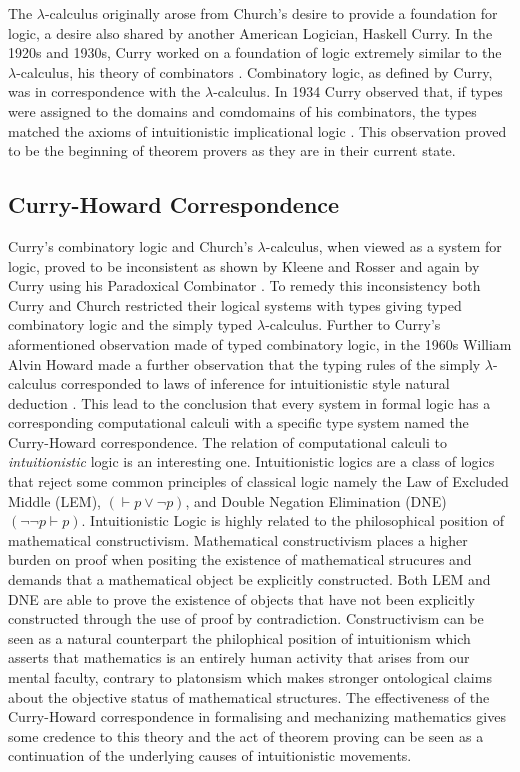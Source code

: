 The $\lambda$-calculus originally arose from Church's desire to provide a foundation
for logic, a desire also shared by another American Logician, Haskell Curry. In
the 1920s and 1930s, Curry worked on a foundation of logic extremely similar to
the $\lambda$-calculus, his theory of combinators \cite{curry1930grundlagen}.
Combinatory logic, as defined by Curry, was in correspondence with the
$\lambda$-calculus. In 1934 Curry observed that, if types were assigned to the
domains and comdomains of his combinators, the types matched the axioms of
intuitionistic implicational logic \cite{curry1934functionality}. This
observation proved to be the beginning of theorem provers as they are in their
current state.

\subsection{Curry-Howard Correspondence}
Curry's combinatory logic and Church's $\lambda$-calculus, when viewed as a
system for logic, proved to be inconsistent as shown by Kleene and Rosser
\cite{kleene1935inconsistency} and again by Curry using his Paradoxical
Combinator \cite{curry1941paradox}. To remedy this inconsistency both Curry and
Church restricted their logical systems with types giving typed combinatory logic
and the simply typed $\lambda$-calculus. Further to Curry's aformentioned
observation made of typed combinatory logic, in the 1960s William Alvin Howard
made a further observation that the typing rules of the simply
$\lambda$-calculus corresponded to laws of inference for intuitionistic style
natural deduction \cite{howard1980formulae}. This lead to the conclusion that
every system in formal logic has a corresponding computational calculi with a
specific type system named the Curry-Howard correspondence. The relation of
computational calculi to \textit{intuitionistic} logic is an interesting one.
Intuitionistic logics are a class of logics that reject some common principles
of classical logic namely the Law of Excluded Middle (LEM), $(\vdash p \lor \lnot p)$,
and Double Negation Elimination (DNE) $(\lnot \lnot p \vdash p)$. Intuitionistic Logic
is highly related to the philosophical position of mathematical constructivism.
Mathematical constructivism places a higher burden on proof when positing the
existence of mathematical strucures and demands that a mathematical object be
explicitly constructed.  Both LEM and DNE are able to prove the existence of
objects that have not been explicitly constructed through the use of proof by
contradiction. Constructivism can be seen as a natural counterpart the
philophical position of intuitionism which asserts that mathematics is an
entirely human activity that arises from our mental faculty, contrary to
platonsism which makes stronger ontological claims about the objective status of
mathematical structures. The effectiveness of the Curry-Howard correspondence in
formalising and mechanizing mathematics gives some credence to this theory and
the act of theorem proving can be seen as a continuation of the underlying
causes of intuitionistic movements.

